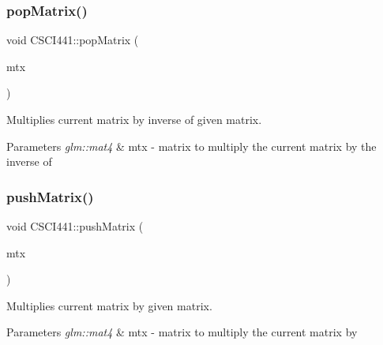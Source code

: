 \subsubsection{\texorpdfstring{pop\+Matrix()}{popMatrix()}}
{\footnotesize\ttfamily void C\+S\+C\+I441\+::pop\+Matrix (\begin{DoxyParamCaption}\item[{glm\+::mat4}]{mtx }\end{DoxyParamCaption})\hspace{0.3cm}{\ttfamily [inline]}}



Multiplies current matrix by inverse of given matrix. 


\begin{DoxyParams}{Parameters}
{\em glm\+::mat4} & mtx -\/ matrix to multiply the current matrix by the inverse of \\
\hline
\end{DoxyParams}
\mbox{\label{namespace_c_s_c_i441_aa818e8189c42c50e88d6d0512274bcfb}} 
\subsubsection{\texorpdfstring{push\+Matrix()}{pushMatrix()}}
{\footnotesize\ttfamily void C\+S\+C\+I441\+::push\+Matrix (\begin{DoxyParamCaption}\item[{glm\+::mat4}]{mtx }\end{DoxyParamCaption})\hspace{0.3cm}{\ttfamily [inline]}}



Multiplies current matrix by given matrix. 


\begin{DoxyParams}{Parameters}
{\em glm\+::mat4} & mtx -\/ matrix to multiply the current matrix by \\
\hline
\end{DoxyParams}
